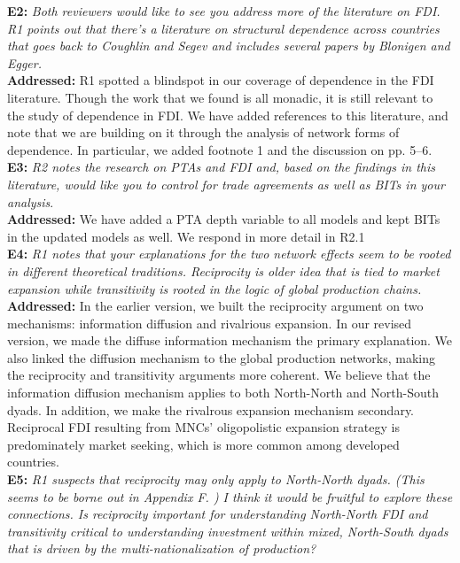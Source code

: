 \documentclass[a4paper,11pt]{texMemo}
\begin{document}
\noindent \textbf{E2:} \emph{Both reviewers would like to see you address more of the literature on FDI. R1 points out that there's a literature on structural dependence across countries that goes back to Coughlin and Segev and includes several papers by Blonigen and Egger.} \\

\noindent \textbf{Addressed:} R1 spotted a blindspot in our coverage of dependence in the FDI literature. Though the work that we found is all monadic, it is still relevant to the study of dependence in FDI. We have added references to this literature, and note that we are building on it through the analysis of network forms of dependence. In particular, we added footnote 1 and the discussion on pp. 5--6.  \\

\noindent \textbf{E3:} \emph{R2 notes the research on PTAs and FDI and, based on the findings in this literature, would like you to control for trade agreements as well as BITs in your analysis}.\\

\noindent \textbf{Addressed:} We have added a PTA depth variable to all models and kept BITs in the updated models as well. We respond in more detail in R2.1\\

\noindent \textbf{E4:} \emph{R1 notes that your explanations for the two network effects seem to be rooted in different theoretical traditions. Reciprocity is older idea that is tied to market expansion while transitivity is rooted in the logic of global production chains.} \\

\noindent \textbf{Addressed:}  %
In the earlier version, we built the reciprocity argument on two mechanisms: information diffusion and rivalrious expansion. In our revised version, we made the diffuse information mechanism the primary explanation. We also linked the diffusion mechanism to the global production networks, making the reciprocity and transitivity arguments more coherent. We believe that the information diffusion mechanism applies to both North-North and North-South dyads. In addition, we make the rivalrous expansion mechanism secondary. Reciprocal FDI resulting from MNCs' oligopolistic expansion strategy is predominately market seeking, which is more common among developed countries. \\

\noindent \textbf{E5:} \emph{R1 suspects that reciprocity may only apply to North-North dyads. (This seems to be borne out in Appendix F. ) I think it would be fruitful to explore these connections. Is reciprocity important for understanding North-North FDI and transitivity critical to understanding investment within mixed, North-South dyads that is driven by the multi-nationalization of production?}\\
\end{document}
